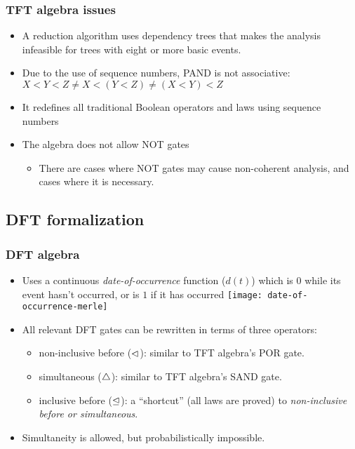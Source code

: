 \begin{frame}
\frametitle{TFT algebra issues}

\begin{itemize}
  \item A reduction algorithm uses dependency trees that makes the analysis infeasible for trees with eight or more basic events.
  \item Due to the use of sequence numbers, PAND is not associative: $X<Y<Z \ne X<(Y<Z) \ne (X<Y)<Z$ 
  \item It redefines all traditional Boolean operators and laws using sequence numbers 
  \item The algebra does not allow NOT gates
    \begin{itemize}
      \item<2-> There are cases where NOT gates may cause non-coherent analysis, and cases where it is necessary.
    \end{itemize}
\end{itemize}
\end{frame}

\subsection{DFT formalization}

\begin{frame}
\frametitle{DFT algebra}

\begin{itemize}
  \item Uses a continuous \emph{date-of-occurrence} function ($d(t)$) which is $0$ while its event hasn't occurred, or is $1$ if it has occurred
  \texttt{[image: date-of-occurrence-merle]}
  \item All relevant DFT gates can be rewritten in terms of three operators: 
    \begin{itemize}
      \item non-inclusive before ($\operatorname{\lhd}$): similar to TFT algebra's POR gate.
      \item simultaneous ($\operatorname{\triangle}$): similar to TFT algebra's SAND gate.
      \item inclusive before ($\operatorname{\unlhd}$): a ``shortcut'' (all laws are proved) to \emph{non-inclusive before or simultaneous}.
    \end{itemize}  
  \item Simultaneity is allowed, but probabilistically impossible.
\end{itemize}
\end{frame}



